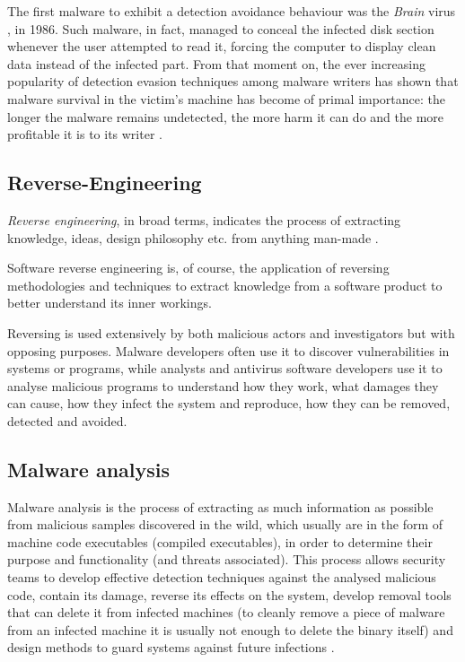 \documentclass[pdfa%
,cucitura%
]{toptesi}
\begin{document}
The first malware to exhibit a detection avoidance behaviour was the \textit{Brain} virus \cite{SkoudisFMC}, in 1986. Such malware, in fact, managed to conceal the infected disk section whenever the user attempted to read it, forcing the computer to display clean data instead of the infected part. From that moment on, the ever increasing popularity of detection evasion techniques among malware writers has shown that malware survival in the victim's machine has become of primal importance: the longer the malware remains undetected, the more harm it can do and the more profitable it is to its writer \cite{NamanyaTWM}.

\subsection{Reverse-Engineering}
\textit{Reverse engineering}, in broad terms, indicates the process of extracting knowledge, ideas, design philosophy etc. from anything man-made \cite{EilamRSRE}.

Software reverse engineering is, of course, the application of reversing methodologies and techniques to extract knowledge from a software product to better understand its inner workings.

Reversing is used extensively by both malicious actors and investigators but with opposing purposes. Malware developers often use it to discover vulnerabilities in systems or programs, while analysts and antivirus software developers use it to analyse malicious programs to understand how they work, what damages they can cause, how they infect the system and reproduce, how they can be removed, detected and avoided.

\subsection{Malware analysis}
Malware analysis is the process of extracting as much information as possible from malicious samples discovered in the wild, which usually are in the form of machine code executables (compiled executables), in order to determine their purpose and functionality (and threats associated). This process allows security teams to develop effective detection techniques against the analysed malicious code, contain its damage, reverse its effects on the system, develop removal tools that can delete it from infected machines (to cleanly remove a piece of malware from an infected machine it is usually not enough to delete the binary itself) and design methods to guard systems against future infections \cite{BayerDAMC}.
\end{document}
